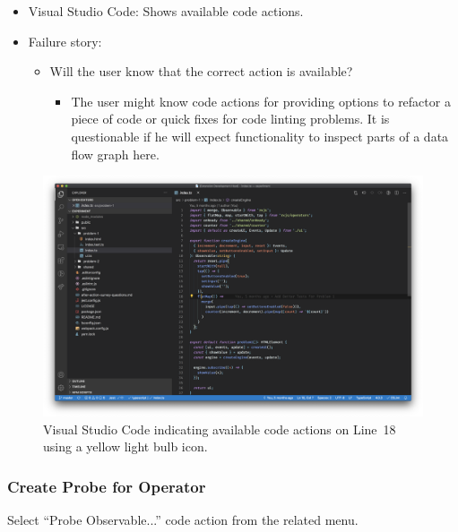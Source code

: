 \documentclass[sigplan,screen,nonacm,review]{acmart}
\begin{document}
\begin{itemize}
	\item Visual Studio Code: Shows available code actions.
	\item Failure story:
	      \begin{itemize}
	      	\item Will the user know that the correct action is available?
	      	      \begin{itemize}
	      	      	\item The user might know code actions for providing options to refactor a piece of code or quick fixes for code linting problems. It is questionable if he will expect functionality to inspect parts of a data flow graph here.
	      	      \end{itemize}
	      \end{itemize}
\end{itemize}

\begin{figure}[ht]
	\centering
	\includegraphics[width=\columnwidth]{walkthrough-screenshots/step3and4.png}
	\Description{}
	\caption{Visual Studio Code indicating available code actions on Line~18 using a yellow light bulb icon.}
	\label{fig:walkthrough-screesnhot-step-3}
\end{figure}


\subsubsection{Create Probe for Operator}
Select ``Probe Observable...'' code action from the related menu.
\end{document}
